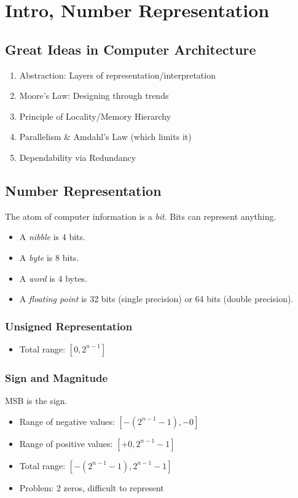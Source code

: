 \chapter{Intro, Number Representation}

\section{Great Ideas in Computer Architecture}
\begin{enumerate}
    \item Abstraction: Layers of representation/interpretation
    \item Moore’s Law: Designing through trends
    \item Principle of Locality/Memory Hierarchy
    \item Parallelism \& Amdahl's Law (which limits it)
    \item Dependability via Redundancy
\end{enumerate}

\section{Number Representation}
The atom of computer information is a \emph{bit}. Bits can represent anything.
\begin{itemize}
    \item A \emph{nibble} is 4 bits.
    \item A \emph{byte} is 8 bits.
    \item A \emph{word} is 4 bytes.
    \item A \emph{floating point} is 32 bits (single precision) or 64 bits (double precision).
\end{itemize}

\subsection{Unsigned Representation}
\begin{itemize}
    \item Total range: \([0, 2^{n-1}]\)
\end{itemize}

\subsection{Sign and Magnitude}
MSB is the sign.
\begin{itemize}
	\item Range of negative values: \([-(2^{n-1}-1), -0]\)
	\item Range of positive values: \([+0, 2^{n-1}-1]\)
    \item Total range: \([-(2^{n-1}-1), 2^{n-1}-1]\)
    \item Problem: 2 zeros, difficult to represent
\end{itemize}
	
